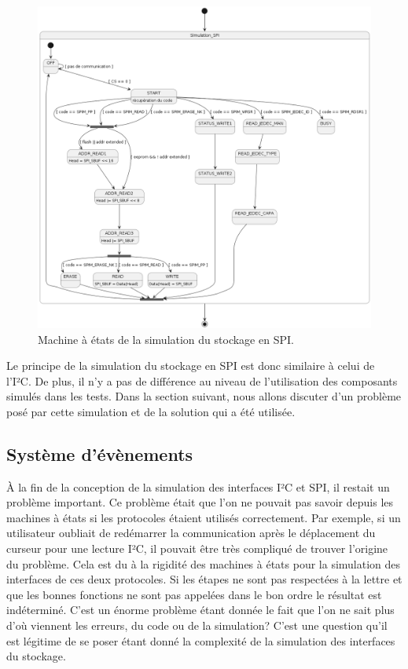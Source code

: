 \documentclass[a4paper]{article}
\begin{document}
\begin{figure}[h!]
  \begin{center}
    \includegraphics[scale=0.4]{./graphs/sm-spi.png}
    \caption{Machine à états de la simulation du stockage en SPI.}
    \label{fig:smspi}
  \end{center}
\end{figure}

Le principe de la simulation du stockage en SPI est donc similaire à celui de
l'I²C. De plus, il n'y a pas de différence au niveau de l'utilisation des
composants simulés dans les tests. Dans la section suivant, nous allons discuter
d'un problème posé par cette simulation et de la solution qui a été utilisée.
\subsection{Système d'évènements}%

À la fin de la conception de la simulation des interfaces I²C et SPI, il restait
un problème important. Ce problème était que l'on ne pouvait pas savoir depuis
les machines à états si les protocoles étaient utilisés correctement. Par
exemple, si un utilisateur oubliait de redémarrer la communication après le
déplacement du curseur pour une lecture I²C, il pouvait être très compliqué de
trouver l'origine du problème. Cela est du à la rigidité des machines à états
pour la simulation des interfaces de ces deux protocoles. Si les étapes ne sont
pas respectées à la lettre et que les bonnes fonctions ne sont pas appelées
dans le bon ordre le résultat est indéterminé. C'est un énorme problème étant
donnée le fait que l'on ne sait plus d'où viennent les erreurs, du code ou de la
simulation? C'est une question qu'il est légitime de se poser étant donné la
complexité de la simulation des interfaces du stockage.
\end{document}
